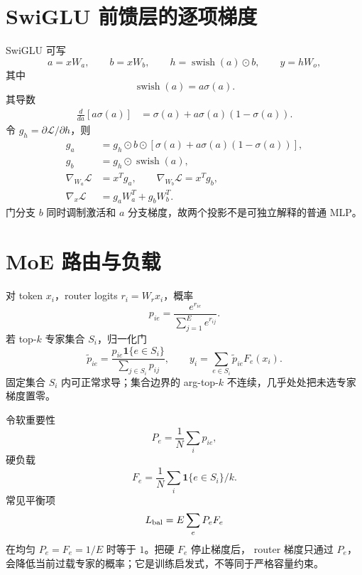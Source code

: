 \documentclass[11pt]{article}
\numberwithin{equation}{section}
\newcommand{\1}{\mathbf{1}}
\newcommand{\cL}{\mathcal{L}}
\begin{document}
\section{SwiGLU 前馈层的逐项梯度}

SwiGLU 可写
\begin{equation}
 a=xW_a,\qquad b=xW_b,\qquad
 h=\operatorname{swish}(a)\odot b,\qquad
 y=hW_o,
\end{equation}
其中
\begin{equation}
 \operatorname{swish}(a)=a\sigma(a).
\end{equation}
其导数
\begin{align}
 \frac d{da}[a\sigma(a)]
 &=\sigma(a)+a\sigma(a)(1-\sigma(a)).
\end{align}
令 $g_h=\partial\cL/\partial h$，则
\begin{align}
 g_a&=g_h\odot b\odot
 [\sigma(a)+a\sigma(a)(1-\sigma(a))],\\
 g_b&=g_h\odot\operatorname{swish}(a),\\
 \nabla_{W_a}\cL&=x^Tg_a,\qquad
 \nabla_{W_b}\cL=x^Tg_b,\\
 \nabla_x\cL&=g_aW_a^T+g_bW_b^T.
\end{align}
门分支 $b$ 同时调制激活和 $a$ 分支梯度，故两个投影不是可独立解释的普通 MLP。

\section{MoE 路由与负载}

对 token $x_i$，router logits $r_i=W_rx_i$，概率
\begin{equation}
 p_{ie}=\frac{e^{r_{ie}}}{\sum_{j=1}^{E}e^{r_{ij}}}.
\end{equation}
若 top-$k$ 专家集合 $S_i$，归一化门
\begin{equation}
 \widetilde p_{ie}=\frac{p_{ie}\1\{e\in S_i\}}
 {\sum_{j\in S_i}p_{ij}},
 \qquad
 y_i=\sum_{e\in S_i}\widetilde p_{ie}F_e(x_i).
\end{equation}
固定集合 $S_i$ 内可正常求导；集合边界的 arg-top-$k$ 不连续，几乎处处把未选专家梯度置零。

令软重要性
\begin{equation}
 P_e=\frac1N\sum_ip_{ie},
\end{equation}
硬负载
\begin{equation}
 F_e=\frac1N\sum_i\1\{e\in S_i\}/k.
\end{equation}
常见平衡项
\begin{equation}
 L_{\rm bal}=E\sum_eP_eF_e
\end{equation}
在均匀 $P_e=F_e=1/E$ 时等于 $1$。把硬 $F_e$ 停止梯度后，
router 梯度只通过 $P_e$，会降低当前过载专家的概率；它是训练启发式，不等同于严格容量约束。
\end{document}
